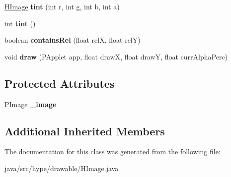 \begin{DoxyCompactItemize}
\item 
\hypertarget{classhype_1_1drawable_1_1_h_image_a5a3f54f38e840c9ea82f00e7e4dd6467}{\hyperlink{classhype_1_1drawable_1_1_h_image}{H\-Image} {\bfseries tint} (int r, int g, int b, int a)}\label{classhype_1_1drawable_1_1_h_image_a5a3f54f38e840c9ea82f00e7e4dd6467}

\item 
\hypertarget{classhype_1_1drawable_1_1_h_image_adf558fb9f12c04e7de5b345f8d7a00c7}{int {\bfseries tint} ()}\label{classhype_1_1drawable_1_1_h_image_adf558fb9f12c04e7de5b345f8d7a00c7}

\item 
\hypertarget{classhype_1_1drawable_1_1_h_image_a115ff4218c705ab812aa91c0a5c0ba40}{boolean {\bfseries contains\-Rel} (float rel\-X, float rel\-Y)}\label{classhype_1_1drawable_1_1_h_image_a115ff4218c705ab812aa91c0a5c0ba40}

\item 
\hypertarget{classhype_1_1drawable_1_1_h_image_aadc15a39c5446530efa9832098007b02}{void {\bfseries draw} (P\-Applet app, float draw\-X, float draw\-Y, float curr\-Alpha\-Perc)}\label{classhype_1_1drawable_1_1_h_image_aadc15a39c5446530efa9832098007b02}

\end{DoxyCompactItemize}
\subsection*{Protected Attributes}
\begin{DoxyCompactItemize}
\item 
\hypertarget{classhype_1_1drawable_1_1_h_image_a26ed394b0920e18b39ed31e750dcc002}{P\-Image {\bfseries \-\_\-image}}\label{classhype_1_1drawable_1_1_h_image_a26ed394b0920e18b39ed31e750dcc002}

\end{DoxyCompactItemize}
\subsection*{Additional Inherited Members}


The documentation for this class was generated from the following file\-:\begin{DoxyCompactItemize}
\item 
java/src/hype/drawable/H\-Image.\-java\end{DoxyCompactItemize}
